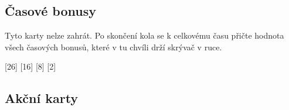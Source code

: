 

\subsection{Časové bonusy}

Tyto karty nelze zahrát. Po skončení kola se k celkovému času přičte hodnota všech časových bonusů, které v tu chvíli drží skrývač v ruce.

\begin{cards}
	[26]
	[16]
\end{cards}

\subsection{Akční karty}

